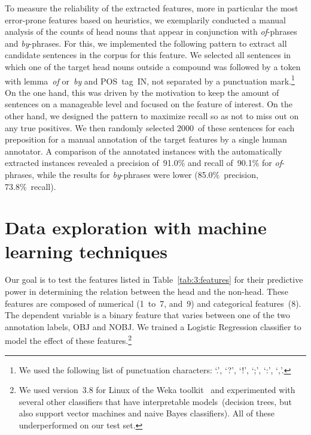 \documentclass[output=paper]{langsci/langscibook}
\begin{document}
To measure the reliability of the extracted features,  {more in particular the most error-prone features based on heuristics,} we exemplarily conducted a manual analysis of the counts of head nouns that appear in conjunction with \textit{of}-phrases and \textit{by}-phrases. For this, we implemented the following pattern to extract all candidate sentences in the corpus for this feature. We selected all sentences in which one of the target head nouns outside a compound was followed by a token with lemma~\textit{of} or~\textit{by} and POS~tag~IN, not separated by a punctuation mark.\footnote{We used the following list of punctuation characters: \lq.\rq, \lq?\rq, \lq!\rq, \lq;\rq, \lq:\rq, \lq,\rq.} On the one hand, this was driven by the motivation to keep the amount of sentences on a manageable level and focused on the feature of interest.
On the other hand, we designed the pattern to maximize recall so as not to miss out on any true positives. We then randomly selected 2000~of these sentences for each preposition for a manual annotation of the target features by a single human annotator. A comparison of the annotated instances with the automatically extracted instances revealed a precision of~91.0\% 
 and recall of~90.1\%  
  for \textit{of}-phrases, while the results for \textit{by}-phrases were lower (85.0\%~precision, 
73.8\%~recall).



\section{Data exploration with machine learning techniques}\label{sec:ML}

Our goal is to test the features listed in Table~\ref{tab:3:features}  for their predictive power in determining the relation between the head and the non-head. These features are composed of numerical (1~to~7, and~9) and categorical features~(8).
The dependent variable is a  {binary} feature that varies between one of the two annotation labels, OBJ and NOBJ. We trained a Logistic Regression classifier to model the effect of these features.\footnote{We used version~3.8 for Linux of the Weka toolkit~\citep{Weka:09} and experimented with several other classifiers that have interpretable models~(decision trees, but also support vector machines and naive Bayes  {classifiers}). All of these underperformed on our test set.} 
\end{document}
